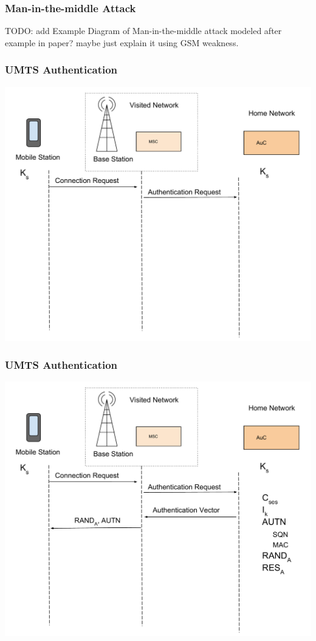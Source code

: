 \documentclass{beamer}
\begin{document}
		\begin{frame}
	\frametitle{Man-in-the-middle Attack}
		TODO: add Example Diagram of Man-in-the-middle attack modeled after example in paper? maybe just explain it using GSM weakness.	
\end{frame}
	\begin{frame}
	\frametitle{UMTS Authentication}
  \begin{center}
  \includegraphics[width=.9\textwidth, height=.85\textheight]{Images/UMTSAuthentication1.pdf}

  \end{center} 
	\end{frame}
	\begin{frame}
	\frametitle{UMTS Authentication}
  \begin{center}
  \includegraphics[width=.9\textwidth, height=.85\textheight]{Images/UMTSAuthentication2.pdf}

  \end{center} 
	\end{frame}
\end{document}
